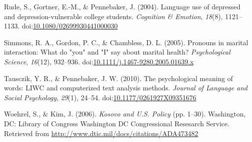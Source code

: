 \documentclass[english,,man,floatsintext]{apa6}
\begin{document}
\leavevmode\hypertarget{ref-Rude2004}{}%
Rude, S., Gortner, E.-M., \& Pennebaker, J. (2004). Language use of depressed and depression-vulnerable college students. \emph{Cognition \& Emotion}, \emph{18}(8), 1121--1133. doi:\href{https://doi.org/10.1080/02699930441000030}{10.1080/02699930441000030}

\leavevmode\hypertarget{ref-Simmons2005}{}%
Simmons, R. A., Gordon, P. C., \& Chambless, D. L. (2005). Pronouns in marital interaction: What do "you" and "I" say about marital health? \emph{Psychological Science}, \emph{16}(12), 932--936. doi:\href{https://doi.org/10.1111/j.1467-9280.2005.01639.x}{10.1111/j.1467-9280.2005.01639.x}

\leavevmode\hypertarget{ref-Tausczik2010}{}%
Tausczik, Y. R., \& Pennebaker, J. W. (2010). The psychological meaning of words: LIWC and computerized text analysis methods. \emph{Journal of Language and Social Psychology}, \emph{29}(1), 24--54. doi:\href{https://doi.org/10.1177/0261927X09351676}{10.1177/0261927X09351676}

\leavevmode\hypertarget{ref-Woehrel2006}{}%
Woehrel, S., \& Kim, J. (2006). \emph{Kosovo and U.S. Policy} (pp. 1--30). Washington, DC: Library of Congress Washington DC Congressional Resesarch Service. Retrieved from \url{http://www.dtic.mil/docs/citations/ADA473482}
\end{document}
